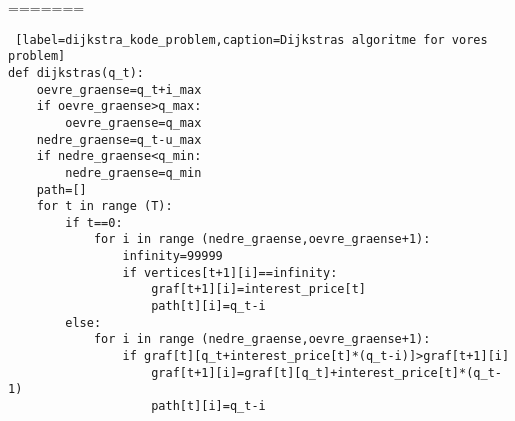 %
=======
\begin{lstlisting} [label=dijkstra_kode_problem,caption=Dijkstras algoritme for vores problem]
def dijkstras(q_t):
	oevre_graense=q_t+i_max
	if oevre_graense>q_max:
		oevre_graense=q_max
	nedre_graense=q_t-u_max
	if nedre_graense<q_min:
		nedre_graense=q_min
	path=[]	
	for t in range (T):
		if t==0:
			for i in range (nedre_graense,oevre_graense+1):
				infinity=99999
				if vertices[t+1][i]==infinity:
					graf[t+1][i]=interest_price[t]
					path[t][i]=q_t-i
		else:
			for i in range (nedre_graense,oevre_graense+1):
				if graf[t][q_t+interest_price[t]*(q_t-i)]>graf[t+1][i]
					graf[t+1][i]=graf[t][q_t]+interest_price[t]*(q_t-1)
					path[t][i]=q_t-i
\end{lstlisting}

